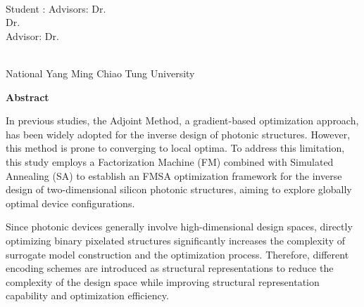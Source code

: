 \begin{center}
    \large
    
    \begin{singlespace}
        \textbf{\englishTitle{}} \\[0.5cm]
    \end{singlespace}
    
    \begin{singlespace}
        Student : \studentEnName{}  \hspace{1.0cm} 
        \ifdefined\advisorCnNameB
            Advisors: Dr.\, \advisorEnName \\
            \hspace{6.6cm} Dr.\, \advisorEnNameB  \\
        \else
            Advisor: Dr.\, \advisorEnName \\
        \fi
    \end{singlespace}
    
    \vspace{0.5cm}
    \begin{singlespace}
        \NameofDepartmentInstituteEN\\
        National Yang Ming Chiao Tung University\\[0.2cm]
    \end{singlespace}
    
    \textbf{Abstract} \\[0.5cm]

\end{center}

\normalsize 
  
In previous studies, the Adjoint Method, a gradient-based optimization approach, 
has been widely adopted for the inverse design of photonic structures. 
However, this method is prone to converging to local optima. To address this limitation, 
this study employs a Factorization Machine (FM) combined with Simulated Annealing (SA) to establish an FMSA optimization framework for the inverse design of two-dimensional silicon photonic structures, aiming to explore globally optimal device configurations.

Since photonic devices generally involve high-dimensional design spaces, 
directly optimizing binary pixelated structures significantly increases the complexity of surrogate model construction and the optimization process.
Therefore, different encoding schemes are introduced as structural representations to reduce the complexity of the design space while improving structural representation capability and optimization efficiency.

